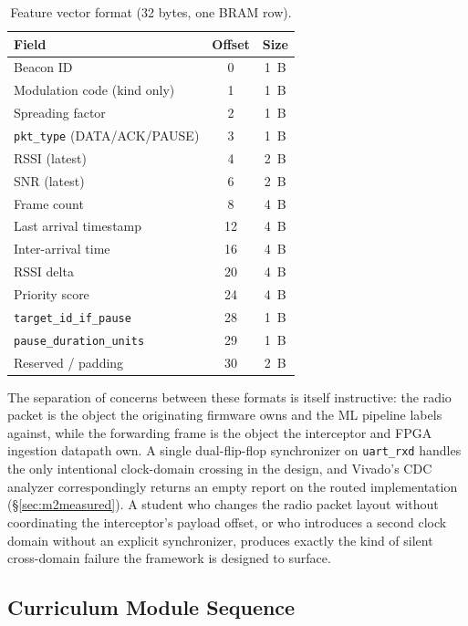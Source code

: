 \documentclass[conference]{IEEEtran}
\begin{document}
\begin{table}[t]
\centering
\caption{Feature vector format (32 bytes, one BRAM row).}
\label{tab:featvec}
\begin{tabular}{l c c}
\toprule
\textbf{Field} & \textbf{Offset} & \textbf{Size} \\
\midrule
Beacon ID                 & 0  & 1~B \\
Modulation code (kind only)& 1 & 1~B \\
Spreading factor          & 2  & 1~B \\
\texttt{pkt\_type} (DATA/ACK/PAUSE) & 3 & 1~B \\
RSSI (latest)             & 4  & 2~B \\
SNR (latest)              & 6  & 2~B \\
Frame count               & 8  & 4~B \\
Last arrival timestamp    & 12 & 4~B \\
Inter-arrival time        & 16 & 4~B \\
RSSI delta                & 20 & 4~B \\
Priority score            & 24 & 4~B \\
\texttt{target\_id\_if\_pause} & 28 & 1~B \\
\texttt{pause\_duration\_units} & 29 & 1~B \\
Reserved / padding        & 30 & 2~B \\
\bottomrule
\end{tabular}
\end{table}

The separation of concerns between these formats is itself instructive: the radio packet is the object the originating firmware owns and the ML pipeline labels against, while the forwarding frame is the object the interceptor and FPGA ingestion datapath own. A single dual-flip-flop synchronizer on \texttt{uart\_rxd} handles the only intentional clock-domain crossing in the design, and Vivado's CDC analyzer correspondingly returns an empty report on the routed implementation (\S\ref{sec:m2measured}). A student who changes the radio packet layout without coordinating the interceptor's payload offset, or who introduces a second clock domain without an explicit synchronizer, produces exactly the kind of silent cross-domain failure the framework is designed to surface.

\subsection{Curriculum Module Sequence}
\end{document}
